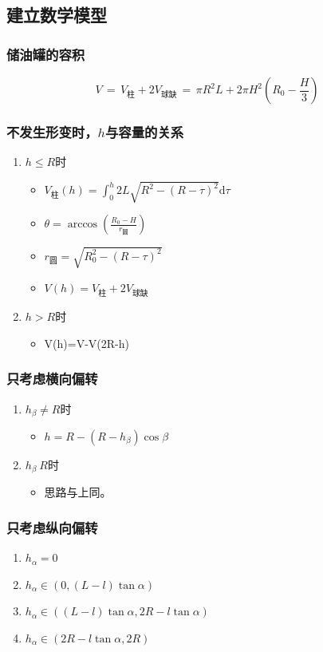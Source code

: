 \subsection{建立数学模型}
\subsubsection*{储油罐的容积}
$$V\,=\,V_{\text{柱}}+2V_{\text{球缺}}\,=\,\pi R^2L+2\pi H^2(R_0-\frac{H}{3})$$
\subsubsection*{不发生形变时，$h$与容量的关系}
\begin{enumerate}
\item $h\leq R$时
    \begin{itemize}
    \item $V_\text{柱}(h)=\int_0^h2L\sqrt{R^2-(R-\tau)^2}{\mathrm{d}}\tau$
    \item $\theta=\arccos\left(\frac{R_0-H}{r_\text{圆}}\right)$
    \item $r_\text{圆}=\sqrt{R_0^2-(R-\tau)^2}$
    \item $V(h)=V_{\text{柱}}+2V_{\text{球缺}}$
    \end{itemize}

\item $h>R$时
    \begin{itemize}
    \item V(h)=V-V(2R-h)
    \end{itemize}
\end{enumerate}

\subsubsection*{只考虑横向偏转}
\begin{enumerate}
\item $h_\beta\neq R$时
    \begin{itemize}
    \item $h=R-(R-h_\beta)\cos\beta$
    \end{itemize}
\item $h_\beta\>R$时
    \begin{itemize}
    \item 思路与上同。
    \end{itemize}
\end{enumerate}
\subsubsection*{只考虑纵向偏转}
\begin{enumerate}
\item $h_\alpha=0$
\item $h_\alpha\in(0,(L-l)\tan\alpha)$
\item $h_\alpha\in((L-l)\tan\alpha,2R-l\tan\alpha)$
\item $h_\alpha\in(2R-l\tan\alpha,2R)$
\end{enumerate}
